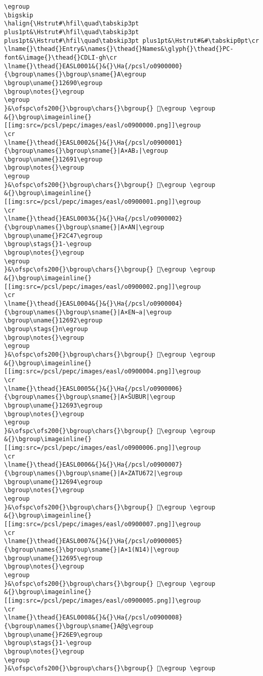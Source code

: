 \begin{verbatim}
\egroup
\bigskip
\halign{\Hstrut#\hfil\quad\tabskip3pt plus1pt&\Hstrut#\hfil\quad\tabskip3pt plus1pt&\Hstrut#\hfil\quad\tabskip3pt plus1pt&\Hstrut#&#\tabskip0pt\cr
\lname{}\thead{}Entry&\names{}\thead{}Names&\glyph{}\thead{}PC-font&\image{}\thead{}CDLI-gh\cr
\lname{}\thead{}EASL0001&{}&{}\Ha{/pcsl/o0900000}{\bgroup\names{}\bgroup\sname{}A\egroup
\bgroup\uname{}12690\egroup
\bgroup\notes{}\egroup
\egroup
}&\ofspc\ofs200{}\bgroup\chars{}\bgroup{} 𒚐\egroup \egroup
&{}\bgroup\imageinline{}[[img:src=/pcsl/pepc/images/easl/o0900000.png]]\egroup
\cr
\lname{}\thead{}EASL0002&{}&{}\Ha{/pcsl/o0900001}{\bgroup\names{}\bgroup\sname{}|A×AB₂|\egroup
\bgroup\uname{}12691\egroup
\bgroup\notes{}\egroup
\egroup
}&\ofspc\ofs200{}\bgroup\chars{}\bgroup{} 𒚑\egroup \egroup
&{}\bgroup\imageinline{}[[img:src=/pcsl/pepc/images/easl/o0900001.png]]\egroup
\cr
\lname{}\thead{}EASL0003&{}&{}\Ha{/pcsl/o0900002}{\bgroup\names{}\bgroup\sname{}|A×AN|\egroup
\bgroup\uname{}F2C47\egroup
\bgroup\stags{}1-\egroup
\bgroup\notes{}\egroup
\egroup
}&\ofspc\ofs200{}\bgroup\chars{}\bgroup{} 󲱇\egroup \egroup
&{}\bgroup\imageinline{}[[img:src=/pcsl/pepc/images/easl/o0900002.png]]\egroup
\cr
\lname{}\thead{}EASL0004&{}&{}\Ha{/pcsl/o0900004}{\bgroup\names{}\bgroup\sname{}|A×EN∼a|\egroup
\bgroup\uname{}12692\egroup
\bgroup\stags{}n\egroup
\bgroup\notes{}\egroup
\egroup
}&\ofspc\ofs200{}\bgroup\chars{}\bgroup{} 𒚒\egroup \egroup
&{}\bgroup\imageinline{}[[img:src=/pcsl/pepc/images/easl/o0900004.png]]\egroup
\cr
\lname{}\thead{}EASL0005&{}&{}\Ha{/pcsl/o0900006}{\bgroup\names{}\bgroup\sname{}|A×ŠUBUR|\egroup
\bgroup\uname{}12693\egroup
\bgroup\notes{}\egroup
\egroup
}&\ofspc\ofs200{}\bgroup\chars{}\bgroup{} 𒚓\egroup \egroup
&{}\bgroup\imageinline{}[[img:src=/pcsl/pepc/images/easl/o0900006.png]]\egroup
\cr
\lname{}\thead{}EASL0006&{}&{}\Ha{/pcsl/o0900007}{\bgroup\names{}\bgroup\sname{}|A×ZATU672|\egroup
\bgroup\uname{}12694\egroup
\bgroup\notes{}\egroup
\egroup
}&\ofspc\ofs200{}\bgroup\chars{}\bgroup{} 𒚔\egroup \egroup
&{}\bgroup\imageinline{}[[img:src=/pcsl/pepc/images/easl/o0900007.png]]\egroup
\cr
\lname{}\thead{}EASL0007&{}&{}\Ha{/pcsl/o0900005}{\bgroup\names{}\bgroup\sname{}|A×1(N14)|\egroup
\bgroup\uname{}12695\egroup
\bgroup\notes{}\egroup
\egroup
}&\ofspc\ofs200{}\bgroup\chars{}\bgroup{} 𒚕\egroup \egroup
&{}\bgroup\imageinline{}[[img:src=/pcsl/pepc/images/easl/o0900005.png]]\egroup
\cr
\lname{}\thead{}EASL0008&{}&{}\Ha{/pcsl/o0900008}{\bgroup\names{}\bgroup\sname{}A@g\egroup
\bgroup\uname{}F26E9\egroup
\bgroup\stags{}1-\egroup
\bgroup\notes{}\egroup
\egroup
}&\ofspc\ofs200{}\bgroup\chars{}\bgroup{} 󲛩\egroup \egroup

\end{verbatim}
